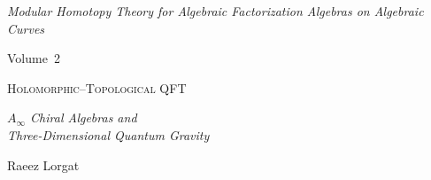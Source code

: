 \documentclass[11pt]{memoir}
\begin{document}
\label{V1-tab:master-invariants}%
\label{V1-thm:algebraic-string-dictionary}%
\label{V1-thm:ambient-complementarity-fmp}%
\label{V1-thm:analytic-algebraic-comparison}%
\label{V1-thm:arnold-genus1}%
\label{V1-thm:arnold-three}%
\label{V1-thm:bar-cohomology-level-independence}%
\label{V1-thm:chirhoch-local-global-FM}%
\label{V1-thm:FM}%
\label{V1-thm:heisenberg-bv-bar-all-genera}%
\label{V1-thm:htt}%
\label{V1-thm:operadic-complexity-concordance}%
\label{V1-thm:shadow-tower-depth-1-rationality}%
\label{V1-thm:thqg-mc-forced-consistency}%
\label{V1-thm:topologization}%
\label{V1-thm:universal-class-M-C-is-6}%
\label{V1-thm:universal-generating-function}%
\label{V1-thm:virasoro-chiral-koszul}%
\label{V1-thm:virasoro-motivic-rationality-all-r}%
\label{V3-rem:k3e-cy3-platonic-additivity-fails}%
%

\begin{titlingpage}
\vspace*{3cm}
\begin{center}

{\large\itshape Modular Homotopy Theory for Algebraic Factorization Algebras on Algebraic Curves}

\vspace{0.8cm}

{\normalsize Volume~2}

\vspace{1.5cm}

{\HUGE\scshape Holomorphic--Topological QFT}

\vspace{1.5cm}

{\Large\itshape $A_\infty$ Chiral Algebras and\\
Three-Dimensional Quantum Gravity}

\vspace{3cm}

{\large Raeez Lorgat}

\vspace{2cm}

\end{center}
\end{titlingpage}
\end{document}
